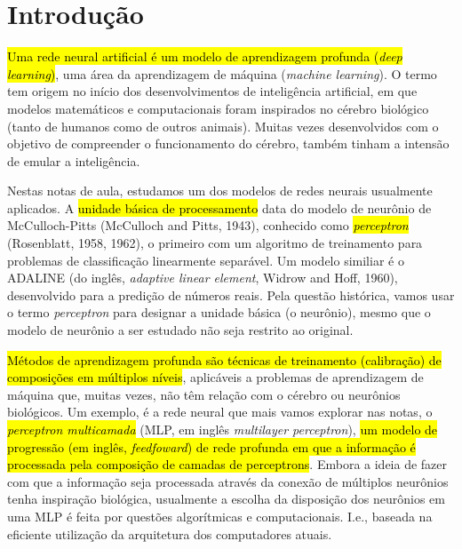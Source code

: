 
\chapter{Introdução}\label{cap_intro}
\thispagestyle{fancy}

\hl{Uma rede neural artificial é um modelo de aprendizagem profunda (\emph{deep learning})}, uma área da aprendizagem de máquina (\emph{machine learning}). O termo tem origem no início dos desenvolvimentos de inteligência artificial, em que modelos matemáticos e computacionais foram inspirados no cérebro biológico (tanto de humanos como de outros animais). Muitas vezes desenvolvidos com o objetivo de compreender o funcionamento do cérebro, também tinham a intensão de emular a inteligência.

Nestas notas de aula, estudamos um dos modelos de redes neurais usualmente aplicados. A \hl{unidade básica de processamento} data do modelo de neurônio de McCulloch-Pitts (McCulloch and Pitts, 1943), conhecido como \hl{\emph{perceptron}} (Rosenblatt, 1958, 1962), o primeiro com um algoritmo de treinamento para problemas de classificação linearmente separável. Um modelo similiar é o ADALINE (do inglês, {\it adaptive linear element}, Widrow and Hoff, 1960), desenvolvido para a predição de números reais. Pela questão histórica, vamos usar o termo \emph{perceptron} para designar a unidade básica (o neurônio), mesmo que o modelo de neurônio a ser estudado não seja restrito ao original.

\hl{Métodos de aprendizagem profunda são técnicas de treinamento (calibração) de composições em múltiplos níveis}, aplicáveis a problemas de aprendizagem de máquina que, muitas vezes, não têm relação com o cérebro ou neurônios biológicos. Um exemplo, é a rede neural que mais vamos explorar nas notas, o \hl{\emph{perceptron multicamada}} (MLP, em inglês \textit{multilayer perceptron}), \hl{um modelo de progressão (em inglês, \textit{feedfoward}) de rede profunda em que a informação é processada pela composição de camadas de perceptrons}. Embora a ideia de fazer com que a informação seja processada através da conexão de múltiplos neurônios tenha inspiração biológica, usualmente a escolha da disposição dos neurônios em uma MLP é feita por questões algorítmicas e computacionais. I.e., baseada na eficiente utilização da arquitetura dos computadores atuais.
